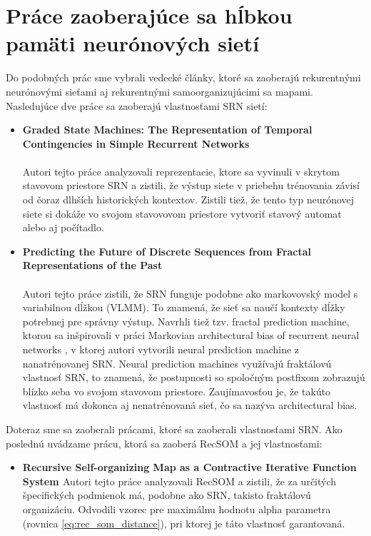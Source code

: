 \chapter[Podobné práce]{Práce zaoberajúce sa hĺbkou pamäti neurónových sietí}

Do podobných prác sme vybrali vedecké články, ktoré sa zaoberajú rekurentnými neurónovými sieťami aj rekurentnými 
samoorganizujúcimi sa mapami. 
Nasledujúce dve práce sa zaoberajú vlastnosťami SRN sietí:
\begin{itemize}
    \item \textbf{
        Graded State Machines: The Representation of Temporal Contingencies in Simple Recurrent Networks \cite{Servan-Schreiber1991}}
         \\ \\
    Autori tejto práce analyzovali reprezentacie, 
    ktore sa vyvinuli v skrytom stavovom priestore SRN a zistili, 
    že výstup siete v priebehu trénovania závisí od čoraz dlhších 
    historických kontextov. 
    Zistili tiež, že tento typ neurónovej siete si dokáže 
    vo svojom stavovovom priestore vytvoriť stavový automat alebo aj počítadlo.

    \item \textbf{
        Predicting the Future of Discrete Sequences from Fractal Representations of the Past  \cite{Tino2001}} \\ \\
    Autori tejto práce zistili, že SRN funguje podobne ako markovovský model s variabilnou dĺžkou (VLMM). 
    To znamená, že sieť sa naučí kontexty dĺžky potrebnej pre správny výstup. 
    Navrhli tiež tzv. fractal prediction machine, ktorou sa inšpirovali v práci Markovian architectural bias of recurrent neural networks \cite{markovnian_bias}, 
    v ktorej autori vytvorili neural prediction machine z nanatrénovanej SRN.
    Neural prediction machines využívajú fraktálovú vlastnosť SRN, to znamená, 
    že postupnosti so spoločným postfixom zobrazujú blízko seba vo svojom stavovom priestore.
    Zaujímavosťou je, že takúto vlastnosť má dokonca aj nenatrénovaná sieť, čo sa nazýva architectural bias.
\end{itemize}

Doteraz sme sa zaoberali prácami, ktoré sa zaoberali vlastnosťami SRN.
Ako poslednú uvádzame prácu, ktorá sa zaoberá RecSOM a jej vlastnosťami:
\begin{itemize}
    \item \textbf{Recursive Self-organizing Map
    as a Contractive Iterative Function System \cite{rsm}}
    Autori tejto práce analyzovali RecSOM a zistili, že za určitých 
    špecifických podmienok má, podobne ako SRN, takisto fraktálovú organizáciu. 
    Odvodili vzorec pre maximálnu hodnotu alpha parametra (rovnica \ref{eq:rec_som_distance}), 
    pri ktorej je táto vlastnosť garantovaná.
\end{itemize}


